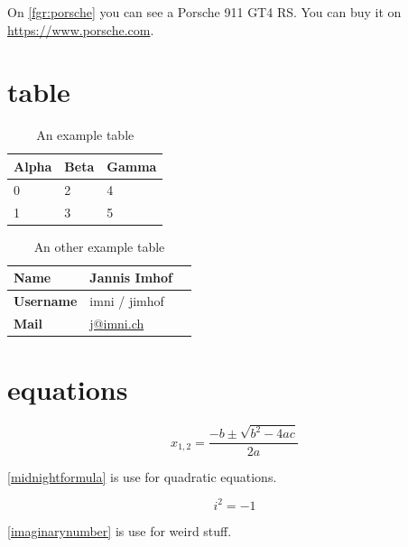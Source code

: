 \documentclass{scrreprt}
\begin{document}
On \autoref{fgr:porsche} you can see a Porsche 911 GT4 RS.
You can buy it on \url{https://www.porsche.com}.

\section{table}

\begin{table}[!h]
    \centering
    \begin{tabularx}{0.5\textwidth}{XXX}
        \hline
        Alpha     & Beta     & Gamma     \\ \hline
        0         & 2        & 4         \\ \hline
        1         & 3        & 5         \\ \hline
    \end{tabularx}
    \caption{An example table}
    \label{tbl:example}
\end{table}

\begin{table}[h]
    \centering
    \begin{tabularx}{\textwidth}{lll}
        
        \hline
        \textbf{Name} & Jannis Imhof
        \\ \hline
        \textbf{Username} & imni / jimhof
        \\ \hline
        \textbf{Mail} & \href{mailto:j@imni.ch}{j@imni.ch}
        \\ \hline

    \end{tabularx}
    \caption{An other example table}
    \label{tbl:otherexample}
\end{table}


\lipsum[2-5]

\section{equations}

\begin{equation}
x_{1,2}=\frac{-b\pm\sqrt{b^2-4ac}}{2a}
\label{midnightformula}
\end{equation}

\autoref{midnightformula} is use for quadratic equations.

\begin{equation}
    i^2 = -1
\label{imaginarynumber}
\end{equation}

\autoref{imaginarynumber} is use for weird stuff.
\end{document}

